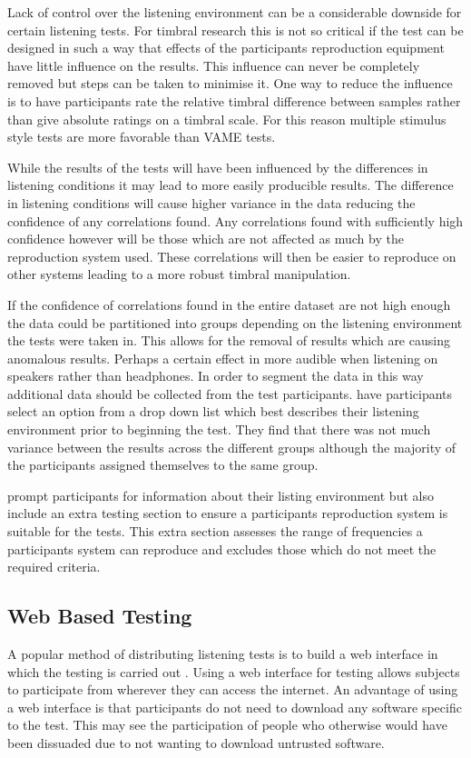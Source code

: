 	Lack of control over the listening environment can be a considerable downside for certain listening tests. For
	timbral research this is not so critical if the test can be designed in such a way that effects of the participants
	reproduction equipment have little influence on the results. This influence can never be completely removed but
	steps can be taken to minimise it. One way to reduce the influence is to have participants rate the relative timbral
	difference between samples rather than give absolute ratings on a timbral scale. For this reason multiple stimulus
	style tests are more favorable than VAME tests.

	While the results of the tests will have been influenced by the differences in listening conditions it may lead to
	more easily producible results. The difference in listening conditions will cause higher variance in the data
	reducing the confidence of any correlations found. Any correlations found with sufficiently high confidence however
	will be those which are not affected as much by the reproduction system used. These correlations will then be easier
	to reproduce on other systems leading to a more robust timbral manipulation.

	If the confidence of correlations found in the entire dataset are not high enough the data could be partitioned into
	groups depending on the listening environment the tests were taken in. This allows for the removal of results which
	are causing anomalous results. Perhaps a certain effect in more audible when listening on speakers rather than
	headphones. In order to segment the data in this way additional data should be collected from the test participants.
	\citet{wilmering2013audio} have participants select an option from a drop down list which best describes their
	listening environment prior to beginning the test. They find that there was not much variance between the results
	across the different groups although the majority of the participants assigned themselves to the same group.

	\citet{seetharaman2014crowdsourcing} prompt participants for information about their listing environment but also
	include an extra testing section to ensure a participants reproduction system is suitable for the tests. This extra
	section assesses the range of frequencies a participants system can reproduce and excludes those which do not meet
	the required criteria.
	
	\subsection{Web Based Testing}
	\label{sec:ListeningTests-DistributedListeningTests-Web}
		A popular method of distributing listening tests is to build a web interface in which the testing is carried
		out \citep{wilmering2013audio, cartwright2013socialeq, seetharaman2014crowdsourcing}. Using a web interface
		for testing allows subjects to participate from wherever they can access the internet. An advantage of using
		a web interface is that participants do not need to download any software specific to the test. This may see
		the participation of people who otherwise would have been dissuaded due to not wanting to download untrusted
		software.

